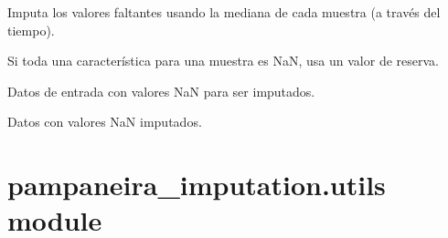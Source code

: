 \documentclass[letterpaper,10pt,english]{sphinxmanual}
\begin{document}
\begin{fulllineitems}
\label{\detokenize{pampaneira_imputation:pampaneira_imputation.imputation_methods.impute_median_sample_wise}}
\pysigstartsignatures
\pysiglinewithargsret
{}
{}
{}
\pysigstopsignatures
\sphinxAtStartPar
Imputa los valores faltantes usando la mediana de cada muestra (a través del tiempo).

\sphinxAtStartPar
Si toda una característica para una muestra es NaN, usa un valor de reserva.
\begin{description}
\begin{description}
\sphinxAtStartPar
Datos de entrada con valores NaN para ser imputados.

\end{description}

\begin{description}
\sphinxAtStartPar
Datos con valores NaN imputados.

\end{description}

\end{description}

\end{fulllineitems}



\section{pampaneira\_imputation.utils module}
\label{\detokenize{pampaneira_imputation:module-pampaneira_imputation.utils}}\label{\detokenize{pampaneira_imputation:pampaneira-imputation-utils-module}}
\end{document}
